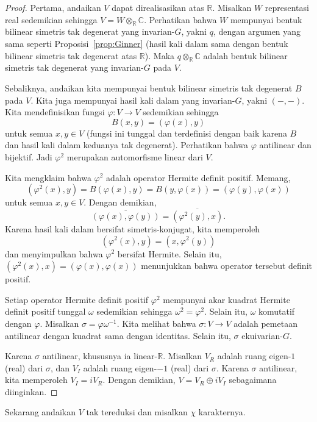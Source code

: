 \documentclass[12pt]{article}
\theoremstyle{plain}
\theoremstyle{definition}
\theoremstyle{remark}
\numberwithin{equation}{section}
\begin{document}
\begin{proof}
Pertama, andaikan $V$ dapat direalisasikan atas $\mathbb{R}$.
Misalkan $W$ representasi real sedemikian sehingga $V = W \otimes_\mathbb{R}
\mathbb{C}$. Perhatikan bahwa $W$ mempunyai bentuk bilinear simetris tak degenerat yang
invarian-$G$, yakni $q$, dengan argumen yang sama seperti Proposisi~\ref{prop:Ginner}
(hasil kali dalam sama dengan bentuk bilinear simetris tak degenerat
atas $\mathbb{R}$). Maka $q \otimes_\mathbb{R} \mathbb{C}$
adalah bentuk bilinear simetris tak degenerat yang invarian-$G$ pada $V$.

Sebaliknya, andaikan kita mempunyai bentuk bilinear simetris tak degenerat $B$
pada $V$. Kita juga mempunyai hasil kali dalam yang invarian-$G$, yakni $(-,-)$.
Kita mendefinisikan fungsi $\varphi : V \to V$ sedemikian sehingga
\[
B(x,y)=(\varphi(x),y)
\]
untuk semua $x,y \in V$
(fungsi ini tunggal dan terdefinisi dengan baik karena $B$ dan hasil kali dalam
keduanya tak degenerat).
Perhatikan bahwa $\varphi$ antilinear dan bijektif.
Jadi $\varphi^2$ merupakan automorfisme linear dari $V$.

Kita mengklaim bahwa $\varphi^2$ adalah operator Hermite definit positif.
Memang,
\[
(\varphi^2(x),y)=B(\varphi(x),y)=B(y,\varphi(x))=(\varphi(y),\varphi(x))
\]
untuk semua $x,y \in V$.
Dengan demikian,
\[
\overline{(\varphi(x),\varphi(y))}=\overline{(\varphi^2(y),x)}.
\]
Karena hasil kali dalam bersifat simetris-konjugat, kita memperoleh
\[
(\varphi^2(x),y)=(x,\varphi^2(y))
\]
dan menyimpulkan bahwa $\varphi^2$ bersifat Hermite.
Selain itu, $(\varphi^2(x),x)=(\varphi(x),\varphi(x))$
menunjukkan bahwa operator tersebut definit positif.

Setiap operator Hermite definit positif $\varphi^2$ mempunyai akar kuadrat
Hermite definit positif tunggal $\omega$ sedemikian sehingga
$\omega^2=\varphi^2$. Selain itu, $\omega$ komutatif dengan $\varphi$.
Misalkan $\sigma = \varphi \omega^{-1}$.
Kita melihat bahwa $\sigma : V \to V$ adalah pemetaan antilinear dengan kuadrat
sama dengan identitas.
Selain itu, $\sigma$ ekuivarian-$G$.

Karena $\sigma$ antilinear, khususnya ia
linear-$\mathbb{R}$. 
Misalkan $V_R$ adalah ruang eigen-$1$ (real) dari $\sigma$, dan $V_I$ adalah
ruang eigen-$-1$ (real) dari $\sigma$. Karena $\sigma$ antilinear,
kita memperoleh $V_I=iV_R$. Dengan demikian, $V=V_R \oplus iV_I$
sebagaimana diinginkan.
\end{proof}

Sekarang andaikan $V$ tak tereduksi dan misalkan $\chi$ karakternya.
\end{document}

